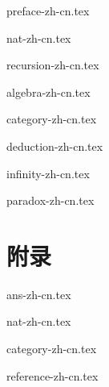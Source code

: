 \documentclass[zihao=5, a5paper, twoside, heading=true]{ctexbook}
\begin{document}
\frontmatter
{preface-zh-cn.tex}


\tableofcontents
\newpage

\mainmatter

{nat-zh-cn.tex}

{recursion-zh-cn.tex}

{algebra-zh-cn.tex}

{category-zh-cn.tex}

{deduction-zh-cn.tex}

{infinity-zh-cn.tex}

{paradox-zh-cn.tex}

\part*{附录}
\appendix
\noappendicestocpagenum
\addappheadtotoc

\backmatter
{ans-zh-cn.tex}

{nat-zh-cn.tex}

{category-zh-cn.tex}

{reference-zh-cn.tex}

\printindex


\end{document}
